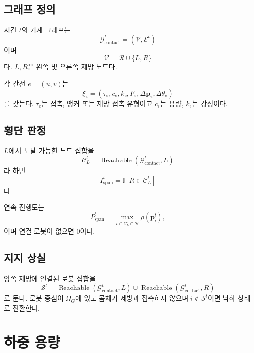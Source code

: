 \documentclass[11pt,a4paper]{article}
\newcommand{\I}{\mathbb{I}}
\newcommand{\Pspan}{P_{\mathrm{span}}}
\newcommand{\Ispan}{I_{\mathrm{span}}}
\newcommand{\Gcontact}{\mathcal{G}_{\mathrm{contact}}}
\begin{document}
\subsection{그래프 정의}

시간 \(t\)의 기계 그래프는
\begin{equation}
  \Gcontact^t=(\mathcal{V},\mathcal{E}^t)
\end{equation}
이며
\begin{equation}
  \mathcal{V}=
  \mathcal{R}\cup\{L,R\}
\end{equation}
다. \(L,R\)은 왼쪽 및 오른쪽 제방 노드다.

각 간선 \(e=(u,v)\)는
\begin{equation}
  \xi_e=
  (\tau_e,c_e,k_e,F_e,\Delta\bm p_e,\Delta\theta_e)
\end{equation}
를 갖는다. \(\tau_e\)는 접촉, 앵커 또는 제방 접촉 유형이고 \(c_e\)는 용량, \(k_e\)는 강성이다.

\subsection{횡단 판정}

\(L\)에서 도달 가능한 노드 집합을
\begin{equation}
  \mathcal{C}_L^t=
  \operatorname{Reachable}(\Gcontact^t,L)
\end{equation}
라 하면
\begin{equation}
  \Ispan^t=
  \I[R\in\mathcal{C}_L^t]
  \label{eq:span-indicator}
\end{equation}
다.

연속 진행도는
\begin{equation}
  \Pspan^t=
  \max_{i\in\mathcal{C}_L^t\cap\mathcal{R}}
  \rho(\bm p_i^t),
  \label{eq:span-progress}
\end{equation}
이며 연결 로봇이 없으면 0이다.

\subsection{지지 상실}

양쪽 제방에 연결된 로봇 집합을
\begin{equation}
  \mathcal{S}^t=
  \operatorname{Reachable}(\Gcontact^t,L)
  \cup
  \operatorname{Reachable}(\Gcontact^t,R)
\end{equation}
로 둔다. 로봇 중심이 \(\Omega_G\)에 있고 몸체가 제방과 접촉하지 않으며
\(i\notin\mathcal{S}^t\)이면 낙하 상태로 전환한다.

\section{하중 용량}
\end{document}
